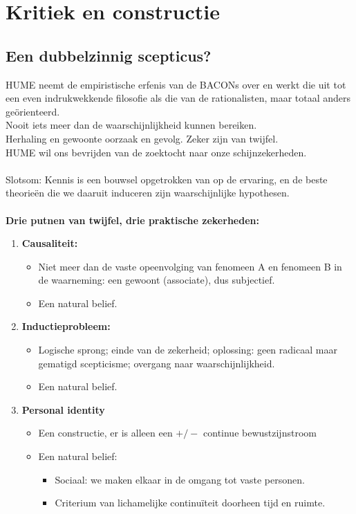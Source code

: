 \section{Kritiek en constructie}
\subsection{Een dubbelzinnig scepticus?}
HUME neemt de empiristische erfenis van de BACONs over en werkt die uit tot een even indrukwekkende filosofie als die van de rationalisten, maar totaal anders ge\"orienteerd.
\\
Nooit iets meer dan de waarschijnlijkheid kunnen bereiken.
\\
Herhaling en gewoonte  oorzaak en gevolg. Zeker zijn van twijfel. 
\\
HUME wil ons bevrijden van de zoektocht naar onze schijnzekerheden.
\\
\\
Slotsom: Kennis is een bouwsel opgetrokken van op de ervaring, en de beste theorieën die we daaruit induceren zijn waarschijnlijke hypothesen. 
\\
\\
\textbf{Drie putnen van twijfel, drie praktische zekerheden:}

\begin{enumerate}
\item \textbf{Causaliteit:} 
\begin{itemize}
\item Niet meer dan de vaste opeenvolging van fenomeen A en fenomeen B in de waarneming: een gewoont (associate), dus subjectief.
\item Een natural belief.
\end{itemize}

\item \textbf{Inductieprobleem:}
\begin{itemize}
\item Logische sprong; einde van de zekerheid; oplossing: geen radicaal maar gematigd scepticisme; overgang naar waarschijnlijkheid.
\item Een natural belief.
\end{itemize}

\item \textbf{Personal identity}
\begin{itemize}
\item Een constructie, er is alleen een $+/-$ continue bewustzijnstroom
\item Een natural belief: \begin{itemize}
\item Sociaal: we maken elkaar in de omgang tot vaste personen.
\item Criterium van lichamelijke continu\"iteit doorheen tijd en ruimte.
\end{itemize}
\end{itemize}
\end{enumerate}
